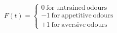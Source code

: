  $F(t) =  \begin{cases} 0\:\mathrm{for\:untrained\:odours}\\-1\:\mathrm{for\:appetitive\:odours}\\+1\:\mathrm{for\:aversive\:odours} \end{cases}$
 